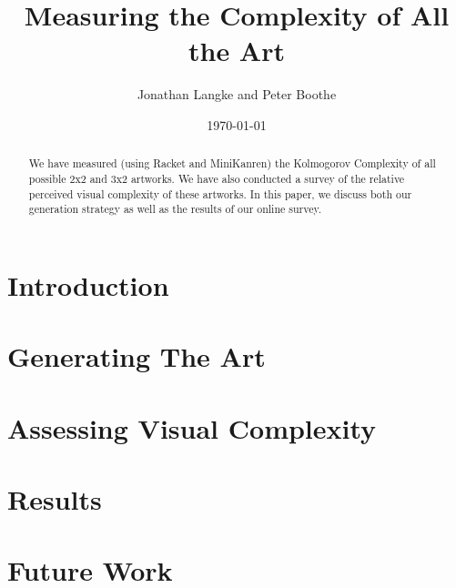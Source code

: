 \documentclass[11pt]{article}
\title{Measuring the Complexity of All the Art}
\author{Jonathan Langke and Peter Boothe}
\date{\today}
\begin{document}
\maketitle

\begin{abstract}
We have measured (using Racket and MiniKanren) the Kolmogorov Complexity of all
possible 2x2 and 3x2 artworks.  We have also conducted a survey of the relative
perceived visual complexity of these artworks.  In this paper, we discuss both
our generation strategy as well as the results of our online survey.
\end{abstract}

\section{Introduction}
\section{Generating The Art}
\section{Assessing Visual Complexity}
\section{Results}
\section{Future Work}
\end{document}
